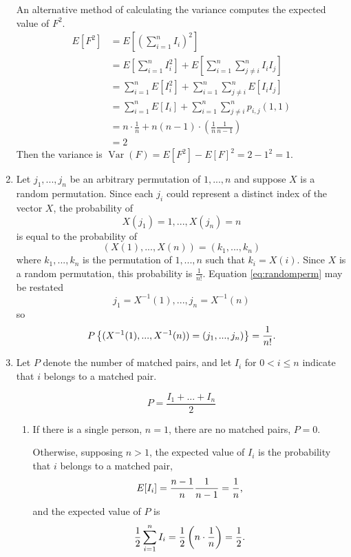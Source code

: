 \documentclass{article}
\DeclareMathOperator{\Var}{Var}
\begin{document}
\begin{enumerate}
    An alternative method of calculating the variance computes the expected value of $F^2$.
    \[\begin{split}
    E[F^2]  & = E\left[\left(\sum_{i=1}^nI_i\right)^2\right] \\
            & = E\left[\sum_{i=1}^nI_i^2\right] + E\left[\sum_{i=1}^n\sum_{j\neq i}^nI_iI_j\right] \\
            & = \sum_{i=1}^n E[I_i^2] + \sum_{i=1}^n\sum_{j\neq i}^n E[I_iI_j] \\
            & = \sum_{i=1}^n E[I_i] + \sum_{i=1}^n\sum_{j\neq i}^n p_{i,j}(1,1) \\
            & = n \cdot \frac{1}{n} + n(n-1) \cdot \left(\frac{1}{n}\frac{1}{n-1}\right) \\
            & = 2
    \end{split}\]
    Then the variance is $\Var(F) = E[F^2] - E[F]^2 = 2 - 1^2 = 1$.
\item
    Let $j_1, ..., j_n$ be an arbitrary permutation of $1, ..., n$ and suppose $X$ is a random permutation.
    Since each $j_i$ could represent a distinct index of the vector $X$, the probability of
    \begin{equation}\label{eq:randomperm}X(j_1)=1, ..., X(j_n)=n \end{equation}
    is equal to the probability of
    \[ \left(X(1),...,X(n)\right) = \left(k_1, ..., k_n\right) \]
    where $k_1, ..., k_n$ is the permutation of $1, ..., n$ such that $k_i=X(i)$.
    Since $X$ is a random permutation, this probability is $\frac{1}{n!}$.
    Equation \eqref{eq:randomperm} may be restated
    \[ j_1 = X^{-1}(1), ..., j_n = X^{-1}(n) \]
    so
    \[ P\left\{( X^{-1}(1), ..., X^{-1}(n) ) = (j_1, ..., j_n)\right\} = \frac{1}{n!} \text. \]
\item
    Let $P$ denote the number of matched pairs, and let $I_i$ for $0 < i \leq n$ indicate that $i$ belongs to a matched pair.

    \[ P = \frac{I_1 + ... + I_n}{2} \]

    \begin{enumerate}
    \item
        If there is a single person, $n=1$, there are no matched pairs, $P=0$.

        Otherwise, supposing $n>1$, the expected value of $I_i$ is the probability that $i$ belongs to a matched pair,
        \[ E[I_i] = \frac{n-1}{n}\frac{1}{n-1} = \frac{1}{n} \text, \]
        and the expected value of $P$ is
        \[ \frac{1}{2}\sum_{i=1}^n I_i = \frac{1}{2}\left( n \cdot \frac{1}{n} \right) = \frac{1}{2} \text.  \]


\end{enumerate}
\end{enumerate}
\end{document}
